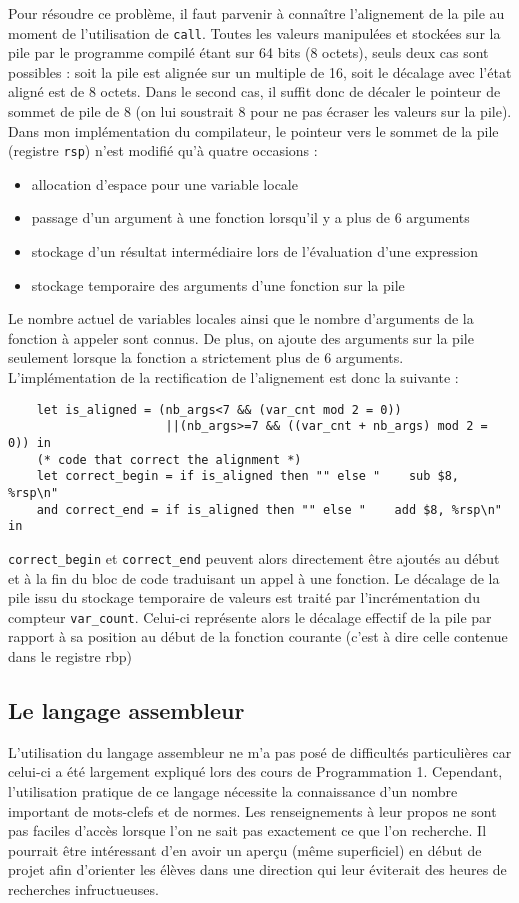\documentclass[11pt]{article}
\newcommand{\ttt}[1]{\texttt{#1}}
\begin{document}
Pour résoudre ce problème, il faut parvenir à connaître l'alignement de la pile au moment de l'utilisation de \ttt{call}.
Toutes les valeurs manipulées et stockées sur la pile par le programme compilé étant sur 64 bits (8 octets), seuls deux cas sont possibles : soit la pile est alignée sur un multiple de 16, soit le décalage avec l'état aligné est de 8 octets.
Dans le second cas, il suffit donc de décaler le pointeur de sommet de pile de 8 (on lui soustrait 8 pour ne pas écraser les valeurs sur la pile).
Dans mon implémentation du compilateur, le pointeur vers le sommet de la pile (registre \ttt{rsp}) n'est modifié qu'à quatre occasions :
\begin{itemize}
    \item allocation d'espace pour une variable locale
    \item passage d'un argument à une fonction lorsqu'il y a plus de 6 arguments
    \item stockage d'un résultat intermédiaire lors de l'évaluation d'une expression
    \item stockage temporaire des arguments d'une fonction sur la pile
\end{itemize}
Le nombre actuel de variables locales ainsi que le nombre d'arguments de la fonction à appeler sont connus.
De plus, on ajoute des arguments sur la pile seulement lorsque la fonction a strictement plus de 6 arguments.
L'implémentation de la rectification de l'alignement est donc la suivante :
\begin{lstlisting}
    let is_aligned = (nb_args<7 && (var_cnt mod 2 = 0)) 
                      ||(nb_args>=7 && ((var_cnt + nb_args) mod 2 = 0)) in 
    (* code that correct the alignment *)
    let correct_begin = if is_aligned then "" else "    sub $8, %rsp\n"
    and correct_end = if is_aligned then "" else "    add $8, %rsp\n" in
\end{lstlisting}
\ttt{correct\_begin} et \ttt{correct\_end} peuvent alors directement être ajoutés au début et à la fin du bloc de code traduisant un appel à une fonction.
Le décalage de la pile issu du stockage temporaire de valeurs est traité par l'incrémentation du compteur \ttt{var\_count}.
Celui-ci représente alors le décalage effectif de la pile par rapport à sa position au début de la fonction courante (c'est à dire celle contenue dans le registre rbp)

\subsection{Le langage assembleur}
L'utilisation du langage assembleur ne m'a pas posé de difficultés particulières car celui-ci a été largement expliqué lors des cours de Programmation 1.
Cependant, l'utilisation pratique de ce langage nécessite la connaissance d'un nombre important de mots-clefs et de normes.
Les renseignements à leur propos ne sont pas faciles d'accès lorsque l'on ne sait pas exactement ce que l'on recherche.
Il pourrait être intéressant d'en avoir un aperçu (même superficiel) en début de projet afin d'orienter les élèves dans une direction qui leur éviterait des heures de recherches infructueuses.
\end{document}
